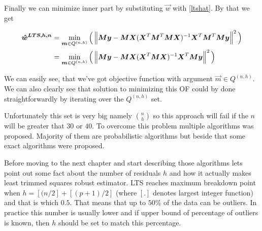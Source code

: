 Finally we can minimize inner part by substituting $\vec{w}$ with \ref{ltshat}. By that we get

\begin{align*}
    \boldsymbol{\hat{w}^{LTS, h, n}}
    &=  \operatorname*{min}_{\boldsymbol{m} \in Q^{(n,h)}} 
    \Big( \left\lVert \boldsymbol{M}\boldsymbol{y} -  \boldsymbol{M}\boldsymbol{X}(\boldsymbol{X}^T\boldsymbol{M}^T\boldsymbol{M}\boldsymbol{X})^{-1}\boldsymbol{X}^T\boldsymbol{M}^T\boldsymbol{M}\boldsymbol{y}  \right\rVert^2 \Big)\\
    &= \operatorname*{min}_{\boldsymbol{m} \in Q^{(n,h)}} 
    \Big( \left\lVert \boldsymbol{M}\boldsymbol{y} -  \boldsymbol{M}\boldsymbol{X}(\boldsymbol{X}^T\boldsymbol{M}\boldsymbol{X})^{-1}\boldsymbol{X}^T\boldsymbol{M}\boldsymbol{y}  \right\rVert^2 \Big)
\end{align*}

We can easily see, that we've got objective function with argument $\vec{m} \in Q^{(n,h)}$. We can also clearly see that solution to minimizing this OF could by done straightforwardly by iterating over the  $Q^{(n,h)}$ set. 

Unfortunately this set is very big namely $\binom{n}{h}$ so this approach will fail if the $n$ will be greater that $30$ or $40$. To overcome this problem multiple algorithms was proposed. Majority of them are probabilistic algorithms but beside that some exact algorithms were proposed. 

Before moving to the next chapter and start describing those algorithms lets point out some fact about the number of residuals $h$ and how it actually makes least trimmed squares robust estimator.
LTS reaches maximum breakdown point when $h = [(n/2] + [(p+1)/2]$ (where $[.]$ denotes largest integer function) and that is  which $0.5$. That means that up to $50\%$ of the data can be outliers. In practice this number is usually lower and if upper bound of percentage of outliers is known, then $h$ should be set to match this percentage.





